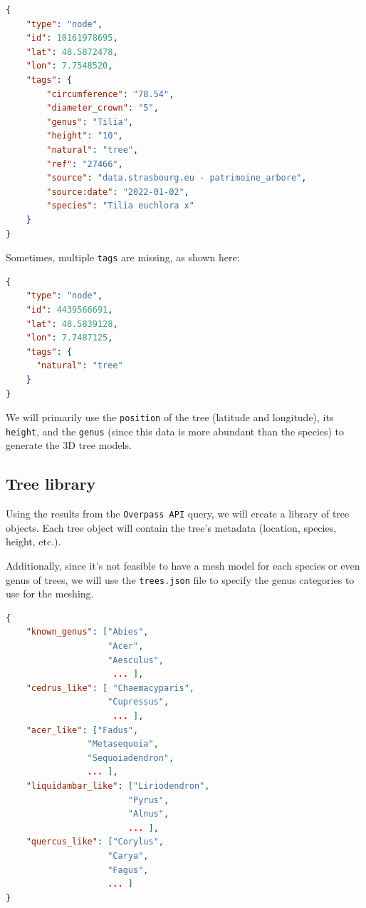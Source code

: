 \documentclass[12pt]{article}
\begin{document}
\begin{lstlisting}[language=json]
{
    "type": "node",
    "id": 10161978695,
    "lat": 48.5872478,
    "lon": 7.7548520,
    "tags": {
        "circumference": "78.54",
        "diameter_crown": "5",
        "genus": "Tilia",
        "height": "10",
        "natural": "tree",
        "ref": "27466",
        "source": "data.strasbourg.eu - patrimoine_arbore",
        "source:date": "2022-01-02",
        "species": "Tilia euchlora x"
    }
}
\end{lstlisting}

Sometimes, multiple \texttt{tags} are missing, as shown here:

\begin{lstlisting}[language=json]
{
    "type": "node",
    "id": 4439566691,
    "lat": 48.5839128,
    "lon": 7.7487125,
    "tags": {
      "natural": "tree"
    }
}
\end{lstlisting}

We will primarily use the \texttt{position} of the tree (latitude and
longitude), its \texttt{height}, and the \texttt{genus} (since this data is
more abundant than the species) to generate the 3D tree models.

\newpage

\subsection{Tree library}
Using the results from the \texttt{Overpass API} query, we will create a
library of tree objects. Each tree object will contain the tree's metadata
(location, species, height, etc.).

Additionally, since it's not feasible to have a mesh model for each species or
even genus of trees, we will use the \texttt{trees.json} file to specify the
genus categories to use for the meshing.

\begin{lstlisting}[language=json]
{
    "known_genus": ["Abies",
                    "Acer",
                    "Aesculus",
                     ... ],
    "cedrus_like": [ "Chaemacyparis",
                    "Cupressus",
                     ... ],
    "acer_like": ["Fadus",
                "Metasequoia",
                "Sequoiadendron",
                ... ],
    "liquidambar_like": ["Liriodendron",
                        "Pyrus",
                        "Alnus",
                        ... ],
    "quercus_like": ["Corylus",
                    "Carya",
                    "Fagus",
                    ... ]
}
\end{lstlisting}
\end{document}

